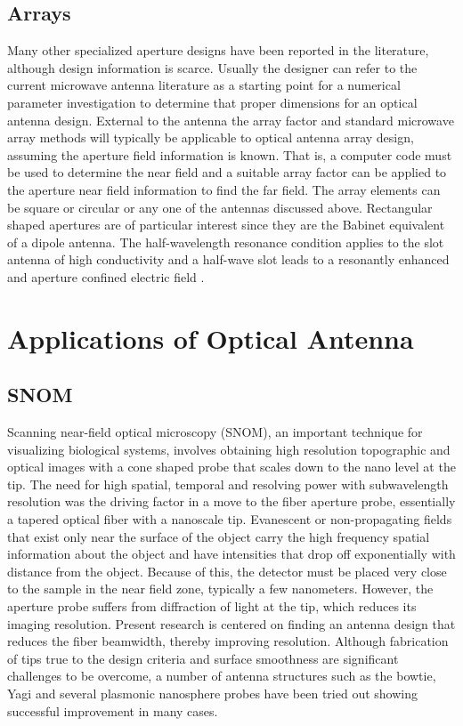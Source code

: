 \subsection{Arrays}
%
Many other specialized aperture designs have been reported in the literature, although design information is scarce. Usually the designer can refer to the current microwave antenna literature as a starting point for a numerical parameter investigation to determine that proper dimensions for an optical antenna design. External to the antenna the array factor and standard microwave array methods will typically be applicable to optical antenna array design, assuming the aperture field information is known. That is, a computer code must be used to determine the near field and a suitable array factor can be applied to the aperture near field information to find the far field. The array elements can be square or circular or any one of the antennas discussed above. Rectangular shaped apertures are of particular interest since they are the Babinet equivalent of a dipole antenna. The half-wavelength resonance condition applies to the slot antenna of high conductivity and a half-wave slot leads to
a resonantly enhanced and aperture confined electric field \cite{Park2009}.
\section{Applications of Optical Antenna}
\subsection{SNOM}
%
Scanning near-field optical microscopy (SNOM), an important technique for visualizing biological systems, involves obtaining high resolution topographic and optical images with a cone shaped probe that scales down to the nano level at the tip. The need for high spatial, temporal and resolving power with subwavelength resolution was the driving factor in a move to the fiber aperture probe, essentially a tapered optical fiber with a nanoscale tip.  Evanescent or non-propagating fields that exist only near the surface of the object carry the high frequency spatial information about the object and have intensities that drop off exponentially with distance from the object. Because of this, the detector must be placed very close to the sample in the near field zone, typically a few nanometers. However, the aperture probe suffers from diffraction of light at the tip, which reduces its imaging resolution. Present research is centered on finding an antenna design that reduces the fiber beamwidth, thereby improving resolution. Although fabrication of tips true to the design criteria and surface smoothness are significant challenges to be overcome, a number of antenna structures such as the bowtie, Yagi and several plasmonic nanosphere probes have been tried out showing successful improvement in many cases.
